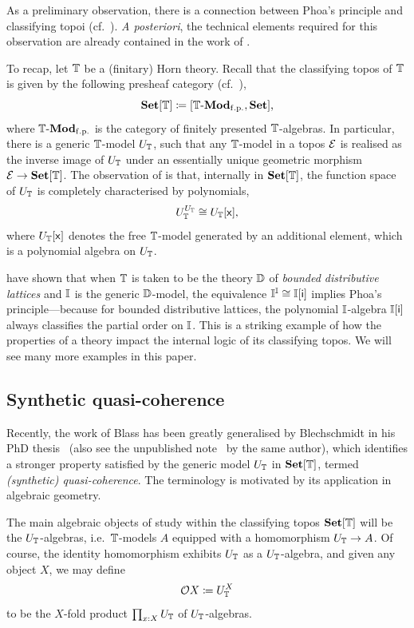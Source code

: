 As a preliminary observation, there is a connection between Phoa's principle and classifying topoi (cf.\ \citet[Lem 3.8]{gratzer2024directed}).
\emph{A posteriori}, the technical elements required for this observation are already contained in the work of \citet{RN879}.

To recap, let $\mathbb{T}$ be a (finitary) Horn theory. Recall that the classifying topos of $\mathbb{T}$ is given by the following presheaf category (cf.\ \citet[D3.1]{johnstone2002sketches}),
\[ \Set[\T] \coloneq [\mmod\T\fp,\Set]\text{,} \]
where $\mmod\T\fp$ is the category of finitely presented $\mathbb{T}$-algebras. In particular, there is a generic $\mathbb{T}$-model $U_{\mathbb{T}}$, such that any $\mathbb{T}$-model in a topos $\mathcal{E}$ is realised as the inverse image of $U_{\mathbb{T}}$ under an essentially unique geometric morphism $\mathcal{E} \to \mathbf{Set}[\mathbb{T}]$. The observation of \citet{RN879} is that, internally in $\mathbf{Set}[\mathbb{T}]$, the function space of $U_{\mathbb{T}}$ is completely characterised by polynomials,
\[ U_\T^{U_\T} \cong U_\T[\ms{x}]\text{,} \]
where $U_{\mathbb{T}}[\mathsf{x}]$ denotes the free $\mathbb{T}$-model generated by an additional element, which is a  polynomial algebra on $U_{\mathbb{T}}$.

\citet{gratzer2024directed} have shown that when $\mathbb{T}$ is taken to be the theory $\mathbb{D}$ of \emph{bounded distributive lattices} and $\mathbb{I}$ is the generic $\mathbb{D}$-model, the equivalence $\mathbb{I}^{\mathbb{I}} \cong \mathbb{I}[\mathsf{i}]$ implies Phoa's principle---because for bounded distributive lattices, the polynomial $\mathbb{I}$-algebra $\mathbb{I}[\mathsf{i}]$ always classifies the partial order on $\mathbb{I}$. This is a striking example of how the properties of a theory impact the internal logic of its classifying topos. We will see many more examples in this paper.

\subsection{Synthetic quasi-coherence}\label{subsec:qc}

Recently, the work of Blass has been greatly generalised by Blechschmidt in his PhD thesis~\citep{blechschmidt2021using} (also see the unpublished note~\citep{blechschmidt2020general} by the same author), which identifies a stronger property satisfied by the generic model $U_{\mathbb{T}}$ in $\mathbf{Set}[\mathbb{T}]$, termed \emph{(synthetic) quasi-coherence}. The terminology is motivated by its application in algebraic geometry.

The main algebraic objects of study within the classifying topos $\mathbf{Set}[\mathbb{T}]$ will be the $U_{\mathbb{T}}$-algebras, i.e.\ $\mathbb{T}$-models $A$ equipped with a homomorphism $U_{\mathbb{T}}\to A$. Of course, the identity homomorphism exhibits $U_{\mathbb{T}}$ as a $U_{\mathbb{T}}$-algebra, and given any object $X$, we may define \[\mathcal{O} X\coloneq U_{\mathbb{T}}^X\] to be the $X$-fold product $\prod_{x:X}U_{\mathbb{T}}$ of $U_{\mathbb{T}}$-algebras. 

